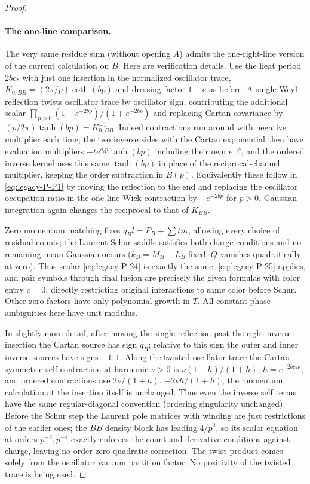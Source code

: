 \begin{proof}
\paragraph{The one-line comparison.}
The very same residue sum (without opening \(A\)) admits the one-right-line version of the current calculation on \(B\). Here are verification details. Use the heat period \(2bc_*\) with just one insertion in the normalized oscillator trace, \(K_{0,BB}=(2\pi/p)\coth(bp)\) and dressing factor \(1-e\) as before. A single Weyl reflection twists oscillator trace by oscillator sign, contributing the additional scalar \(\prod_{p>0}(1-e^{-2bp})/(1+e^{-2bp})\) and replacing Cartan covariance by \((p/2\pi)\tanh(bp)=K_{0,BB}^{-1}\). Indeed contractions run around with negative multiplier each time; the two inverse sides with the Cartan exponential then have evaluation multipliers \(-t e^{a_t p}\tanh(bp)\) including their own \(e^{-\phi}\), and the ordered inverse kernel uses this same \(\tanh(bp)\) in place of the reciprocal-channel multiplier, keeping the order subtraction in \(B(p)\). Equivalently these follow in \eqref{eq:legacy-P-P1} by moving the reflection to the end and replacing the oscillator occupation ratio in the one-line Wick contraction by \(-e^{-2bp}\) for \(p>0\). Gaussian integration again changes the reciprocal to that of \(K_{BB}\).

Zero momentum matching fixes \(q_B l=P_B+\sum t n_t\), allowing every choice of residual counts; the Laurent Schur saddle satisfies both charge conditions and no remaining mean Gaussian occurs (\(k_B=M_B-L_B\) fixed, \(Q\) vanishes quadratically at zero). Thus scalar \eqref{eq:legacy-P-24} is exactly the same; \eqref{eq:legacy-P-25} applies, and pair symbols through final fusion are precisely the given formulas with color entry \(c=0\), directly restricting original interactions to same color before Schur. Other zero factors have only polynomial growth in \(T\). All constant phase ambiguities here have unit modulus.



In slightly more detail, after moving the single reflection past the right inverse insertion the Cartan source has sign \(q_B\); relative to this sign the outer and inner inverse sources have signs \(-1,1\). Along the twisted oscillator trace the Cartan symmetric self contraction at harmonic \(\nu>0\) is \(\nu(1-h)/(1+h)\), \(h=e^{-2bc_*\nu}\), and ordered contractions use \(2\nu/(1+h)\), \(-2\nu h/(1+h)\); the momentum calculation at the insertion itself is unchanged. Thus even the inverse self terms have the same regular-diagonal convention (ordering singularity unchanged). Before the Schur step the Laurent pole matrices with winding are just restrictions of the earlier ones; the \(BB\) density block has leading \(4/p^2\), so its scalar equation at orders \(p^{-2},p^{-1}\) exactly enforces the count and derivative conditions against charge, leaving no order-zero quadratic correction. The twist product comes solely from the oscillator vacuum partition factor. No positivity of the twisted trace is being used.




\end{proof}

